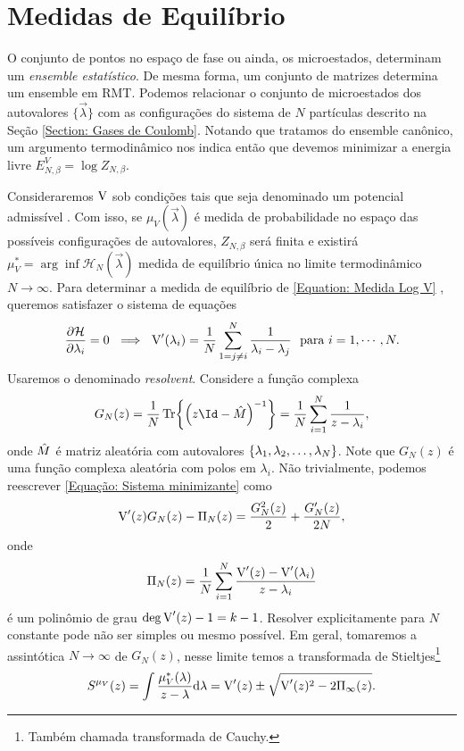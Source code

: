 \section{Medidas de Equilíbrio}
\label{Seção: Medida}
O conjunto de pontos no espaço de fase ou ainda, os microestados, determinam um \textit{ensemble estatístico}. De mesma forma, um conjunto de matrizes determina um ensemble em RMT. Podemos relacionar o conjunto de microestados dos autovalores $\{\vec{\lambda}\}$ com as configurações do sistema de $N$ partículas descrito na Seção \ref{Section: Gases de Coulomb}. Notando que tratamos do ensemble canônico, um argumento termodinâmico nos indica então que devemos minimizar a energia livre $E^V_{N,\beta} = \log{Z_{N, \beta}}.$

Consideraremos $\operatorname{V}$ sob condições tais que seja denominado um potencial admissível \cite{ChafaCoulombMeasure}. Com isso, se $\mu_{V}(\vec{\lambda})$ é medida de probabilidade no espaço das possíveis configurações de autovalores, $Z_{N, \beta}$ será finita e existirá $\mu_{V}^* = \arg \inf {\mathcal{H}_N(\vec{\lambda})}$ medida de equilíbrio única no limite termodinâmico $N \rightarrow \infty$. Para determinar a medida de equilíbrio de \ref{Equation: Medida Log V} \cite{RMT-firstcourse-Potters}, queremos satisfazer o sistema de equações
\begin{equation}
	\frac{\partial \mathcal{H}}{\partial \lambda_i} = 0 \ \implies \ \operatorname{V}'(\lambda_i) = \frac{1}{N} \sum_{1 = j \neq i}^{N} \frac{1}{\lambda_i - \lambda_j} \ \ \text{para} \ i = 1, \cdots, N.
	\label{Equação: Sistema minimizante}
\end{equation} 
Usaremos o denominado \textit{resolvent}. Considere a função complexa $$G_N(z) = \frac{1}{N} \Tr{\left(z\Id - \matriz{M}\right)^{-1}} = \frac{1}{N} \sum_{i=1}^{N} \frac{1}{z - \lambda_i},$$ onde $\hat M$ é matriz aleatória com autovalores $\{\lambda_1, \lambda_2, \dots, \lambda_N\}$. Note que $G_N(z)$ é uma função complexa aleatória com polos em $\lambda_i$. Não trivialmente, podemos reescrever \ref{Equação: Sistema minimizante} como $$\operatorname{V}'(z) G_N(z) - \Pi_N(z) = \frac{G_N^2(z)}{2} + \frac{G'_N(z)}{2N},$$ onde $$\Pi_N(z) = \frac{1}{N} \sum_{i = 1}^{N} \frac{\operatorname{V}'(z) - \operatorname{V}'(\lambda_i)}{z - \lambda_i}$$ é um polinômio de grau $\deg{\operatorname{V}'(z)} - 1 = k - 1$. Resolver explicitamente para $N$ constante pode não ser simples ou mesmo possível. Em geral, tomaremos a assintótica $N \to \infty$ de $G_N(z)$, nesse limite temos a transformada de Stieltjes\footnote{Também chamada transformada de Cauchy.}
\begin{equation}
	S^{\mu_V}(z) = \int \frac{\mu^*_V(\lambda)}{z - \lambda} \dd \lambda= \operatorname{V}'(z) \pm \sqrt{\operatorname{V}'(z)^2 - 2 \Pi_{\infty}(z) }.
	\label{Equation: Resolvent}
\end{equation}

